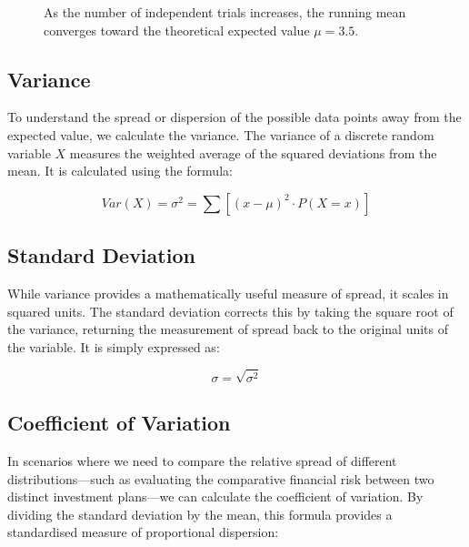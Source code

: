\documentclass[12pt]{scrartcl}
\begin{document}
\begin{figure}[H]
\centering
{}
\caption{As the number of independent trials increases, the running mean converges toward the theoretical expected value $\mu = 3.5$.}
\end{figure}

\subsection{Variance}
To understand the spread or dispersion of the possible data points away from the expected value, we calculate the variance. The variance of a discrete random variable $X$ measures the weighted average of the squared deviations from the mean. It is calculated using the formula:

\[
Var(X) = \sigma^{2} = \sum{[(x - \mu)^2 \cdot P(X = x)]}
\]

\subsection{Standard Deviation}
While variance provides a mathematically useful measure of spread, it scales in squared units. The standard deviation corrects this by taking the square root of the variance, returning the measurement of spread back to the original units of the variable. It is simply expressed as:

\[
\sigma = \sqrt{\sigma^2}
\]

\subsection{Coefficient of Variation}
In scenarios where we need to compare the relative spread of different distributions—such as evaluating the comparative financial risk between two distinct investment plans—we can calculate the coefficient of variation. By dividing the standard deviation by the mean, this formula provides a standardised measure of proportional dispersion:
\end{document}
